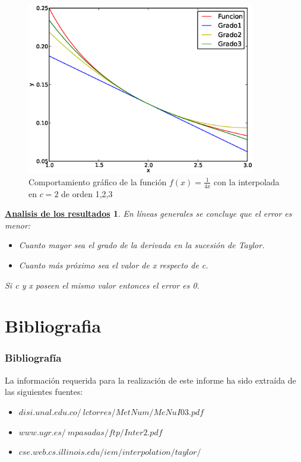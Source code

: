 \documentclass{beamer}
\newtheorem{descripcion de los experimentos}{\underline {Descripcion de los experimentos}}
\newtheorem{analisis}{\underline {Analisis de los resultados}}
\begin{document}
\begin{frame}\label{siguiente}
\begin{figure}
  \caption{Comportamiento gráfico de la función $f(x)=\frac{1}{4x}$ con la interpolada en $c=2$ de orden 1,2,3}
  \includegraphics[width=10cm]{img/sexta.eps}
\end{figure}
\end{frame}

\begin{frame}
\begin{analisis}
En líneas generales se concluye que el error es menor:
\begin {itemize}
\item Cuanto mayor sea el grado de la derivada en la sucesión de Taylor.
\item Cuanto más próximo sea el valor de x respecto de c.
\end {itemize}
\begin {block}{Si c y x poseen el mismo valor entonces el error es 0.}
\end{block}
\end{analisis}
\end{frame}


\section{Bibliografia}
\begin{frame}
 \frametitle{Bibliografía}

   La información requerida para la realización de este informe ha sido extraída de las siguientes fuentes:

  \begin{thebibliography}{10}
    \beamertemplatebookbibitems
\begin{itemize}
\item \href{disi.unal.edu.co/~lctorres/MetNum/MeNuI03.pdf}{$disi.unal.edu.co/~lctorres/MetNum/MeNuI03.pdf$}
\item \href{www.ugr.es/~mpasadas/ftp/Inter2.pdf}{$www.ugr.es/~mpasadas/ftp/Inter2.pdf$}
\item \href{cse.web.cs.illinois.edu/iem/interpolation/taylor/}{$cse.web.cs.illinois.edu/iem/interpolation/taylor/$}
\end {itemize}
  \end{thebibliography}
\end{frame}
\end{document}
